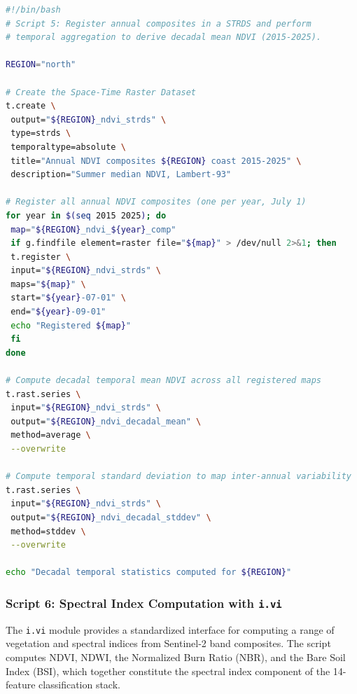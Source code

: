 \documentclass[coasts,article,submit,pdftex,moreauthors]{Definitions/mdpi}
\begin{document}
\begin{lstlisting}[language=bash, caption={Space-Time Raster Dataset creation and temporal aggregation using \texttt{t.rast.series}.}, label={lst:trast}]
#!/bin/bash
# Script 5: Register annual composites in a STRDS and perform
# temporal aggregation to derive decadal mean NDVI (2015-2025).

REGION="north"

# Create the Space-Time Raster Dataset
t.create \
 output="${REGION}_ndvi_strds" \
 type=strds \
 temporaltype=absolute \
 title="Annual NDVI composites ${REGION} coast 2015-2025" \
 description="Summer median NDVI, Lambert-93"

# Register all annual NDVI composites (one per year, July 1)
for year in $(seq 2015 2025); do
 map="${REGION}_ndvi_${year}_comp"
 if g.findfile element=raster file="${map}" > /dev/null 2>&1; then
 t.register \
 input="${REGION}_ndvi_strds" \
 maps="${map}" \
 start="${year}-07-01" \
 end="${year}-09-01"
 echo "Registered ${map}"
 fi
done

# Compute decadal temporal mean NDVI across all registered maps
t.rast.series \
 input="${REGION}_ndvi_strds" \
 output="${REGION}_ndvi_decadal_mean" \
 method=average \
 --overwrite

# Compute temporal standard deviation to map inter-annual variability
t.rast.series \
 input="${REGION}_ndvi_strds" \
 output="${REGION}_ndvi_decadal_stddev" \
 method=stddev \
 --overwrite

echo "Decadal temporal statistics computed for ${REGION}"
\end{lstlisting}

\subsubsection*{Script 6: Spectral Index Computation with \texttt{i.vi}}

The \texttt{i.vi} module provides a standardized interface for computing a range of vegetation and spectral indices from Sentinel-2 band composites. The script computes NDVI, NDWI, the Normalized Burn Ratio (NBR), and the Bare Soil Index (BSI), which together constitute the spectral index component of the 14-feature classification stack.
\end{document}
